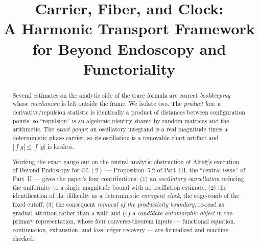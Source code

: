 \documentclass[11pt]{article}
\title{Carrier, Fiber, and Clock:\\
A Harmonic Transport Framework for Beyond Endoscopy and Functoriality}
\author{}
\date{}
\theoremstyle{definition}
\begin{document}
\maketitle

\begin{abstract}
Several estimates on the analytic side of the trace formula are correct \emph{bookkeeping} whose
\emph{mechanism} is left outside the frame. We isolate two. The \emph{product law}: a
derivative/repulsion statistic is identically a product of distances between configuration points, so
``repulsion'' is an algebraic identity shared by random matrices and the arithmetic. The \emph{exact
gauge}: an oscillatory integrand is a real magnitude times a deterministic phase carrier, so its
oscillation is a removable chart artifact and $|\int g|\le\int|g|$ is lossless.

Working the exact gauge out on the central analytic obstruction of Altu\u{g}'s execution of Beyond
Endoscopy for $\mathrm{GL}(2)$ --- Proposition~5.2 of Part~III, the ``central issue'' of Part~II ---
gives the paper's four contributions: (1) an \emph{oscillatory cancellation} reducing the uniformity
to a single magnitude bound with no oscillation estimate; (2) the identification of the difficulty as
a deterministic \emph{emergent clock}, the edge-comb of the fixed cutoff; (3) the consequent
\emph{removal of the productivity boundary}, re-read as gradual attrition rather than a wall; and (4)
a \emph{candidate automorphic object} in the primary representation, whose four converse-theorem
inputs --- functional equation, continuation, exhaustion, and loss-ledger recovery --- are formalized
and machine-checked.


\end{abstract}
\end{document}
